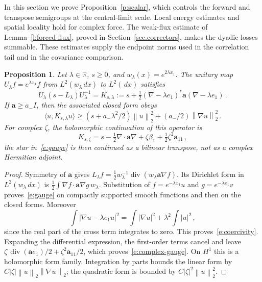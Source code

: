 \documentclass[11pt]{amsart}
\newtheorem{proposition}{Proposition}[section]
\theoremstyle{definition}
\theoremstyle{remark}
\numberwithin{equation}{section}
\newcommand{\R}{\mathbb R}
\renewcommand{\a}{\mathbf a}
\newcommand{\dd}{\,d}
\newcommand{\diver}{\operatorname{div}}
\newcommand{\norm}[1]{\left\|#1\right\|}
\begin{document}
In this section we prove Proposition~\ref{p:scalar}, which controls the forward and transpose semigroups at the central-limit scale. Local energy estimates and spatial locality hold for complex force. The weak-flux estimate of Lemma~\ref{l:forced-flux}, proved in Section~\ref{sec.correctors}, makes the dyadic losses summable. These estimates supply the endpoint norms used in the correlation tail and in the covariance comparison.

\begin{proposition}\label{p:gauge}
Let $\lambda\in\R$, $s\geq0$, and $w_\lambda(x)=e^{2\lambda x_1}$. The unitary map $U_\lambda f=e^{\lambda x_1}f$ from $L^2(w_\lambda\dd x)$ to $L^2(\dd x)$ satisfies
\begin{equation}\label{e:gauge}
 U_\lambda(s-L_\lambda)U_\lambda^{-1}
 =K_{s,\lambda}
 :=s+\tfrac12(\nabla-\lambda e_1)^*\a(\nabla-\lambda e_1)\, .
\end{equation}
If $\a\geq a_-I$, then the associated closed form obeys
\begin{equation}\label{e:coercivity}
 \langle u,K_{s,\lambda}u\rangle
 \geq(s+a_-\lambda^2/2)\norm u_2^2+(a_-/2)\norm{\nabla u}_2^2\, .
\end{equation}
For complex $\zeta$, the holomorphic continuation of this operator is
\begin{equation}\label{e:complex-gauge}
 K_{s,\zeta}=s-\tfrac12\nabla\cdot \a\nabla
       +\zeta\beta_1+\tfrac12\zeta^2\a_{11}\, ,
\end{equation}
the star in~\eqref{e:gauge} is then continued as a bilinear transpose, not as a complex Hermitian adjoint.
\end{proposition}

\begin{proof}
Symmetry of $\a$ gives $L_\lambda f=\tfrac12w_\lambda^{-1} \diver(w_\lambda \a\nabla f)$. Its Dirichlet form in $L^2(w_\lambda\dd x)$ is $\tfrac12\int\nabla f\cdot \a\nabla g\,w_\lambda$. Substitution of $f=e^{-\lambda x_1}u$ and $g=e^{-\lambda x_1}v$ proves~\eqref{e:gauge} on compactly supported smooth functions and then on the closed forms. Moreover
\begin{equation*}
 \int|\nabla u-\lambda e_1u|^2
 =\int|\nabla u|^2+\lambda^2\int|u|^2\, ,
\end{equation*}
since the real part of the cross term integrates to zero. This proves~\eqref{e:coercivity}. Expanding the differential expression, the first-order terms cancel and leave $\zeta\,\diver(\a e_1)/2+\zeta^2\a_{11}/2$, which proves~\eqref{e:complex-gauge}. On $H^1$ this is a holomorphic form family. Integration by parts bounds the linear form by $C|\zeta|\norm u_2\norm{\nabla u}_2$; the quadratic form is bounded by $C|\zeta|^2\norm u_2^2$.
\end{proof}
\end{document}
